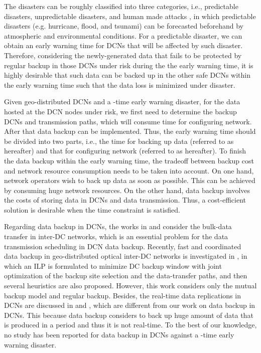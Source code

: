 \documentclass[conference]{IEEEtran}\IEEEoverridecommandlockouts
\begin{document}
The disasters can be roughly  classified into three categories, i.e., predictable disasters, unpredictable disasters, and human made attacks \cite{Mukherjee2014-1}, in which predictable disasters (e.g. hurricane, flood, and tsunami) can be forecasted beforehand by atmospheric and environmental conditions. For a predictable disaster, we can obtain an early warning time for  DCNs that will be affected by such disaster. Therefore,  considering the newly-generated data  that fails to be protected by regular backup in those DCNs under risk during the the early warning time,  it is highly desirable that such data can be backed up in the other safe DCNs within the early warning time such that the data loss is minimized under disaster.

Given  geo-distributed DCNs and  a -time early warning disaster, for the data hosted at the DCN nodes under risk, we first need to determine the backup DCNs and transmission paths, which will consume time for configuring network. After that data backup can be implemented. Thus, the early warning time should be divided into two parts, i.e., the time for backing up data (referred to as  hereafter) and that for configuring network (referred to as  hereafter).
To finish the data backup within the early warning time, the tradeoff between backup cost and network resource consumption needs to be taken into account.  On one hand, network operators wish to back up data as soon as possible. This can be achieved by consuming huge network resources. On the other hand, data backup involves the costs of storing data in DCNs and  data transmission. Thus, a cost-efficient solution is desirable when the time constraint is satisfied.


 Regarding  data backup in DCNs, the works in \cite{Laoutaris2011} and \cite{Mahimkar2011} consider the bulk-data transfer in inter-DC networks, which is  an essential problem for the  data transmission scheduling in DCN data backup. Recently, fast and coordinated data backup in geo-distributed optical inter-DC networks is investigated in \cite{Yao2015}, in which an ILP is formulated to minimize DC backup window with joint optimization of the backup site selection and the data-transfer paths, and then several heuristics are also proposed. However, this work  considers  only the mutual backup  model  and regular backup. Besides, the real-time data replications in DCNs are discussed in \cite{Boru2015} and \cite{Couto2015}, which are different from our work on  data backup in DCNs. This because data backup considers to back up huge amount of data that is produced in a period and thus it is not real-time.
 To the best of our knowledge, no study has been reported for data backup in DCNs against a -time early warning disaster.
\end{document}
